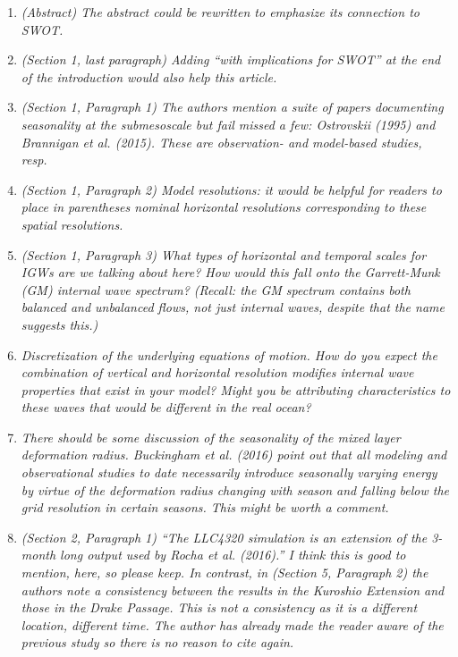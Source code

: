 \documentclass[11pt]{article}
\begin{document}
\begin{enumerate}
  \item {\it (Abstract) The abstract could be rewritten to emphasize its connection to SWOT.}

  \item {\it (Section 1, last paragraph) Adding “with implications for SWOT” at the end of the
          introduction would also help this article.}

  \item {\it (Section 1, Paragraph 1) The authors mention a suite of papers documenting
        seasonality at the submesoscale but fail missed a few: Ostrovskii (1995) and
        Brannigan et al. (2015). These are observation- and model-based studies, resp.}

  \item {\it (Section 1, Paragraph 2) Model resolutions: it would be helpful for readers to place in
        parentheses nominal horizontal resolutions corresponding to these spatial resolutions.}

  \item {\it (Section 1, Paragraph 3) What types of horizontal and temporal scales for IGWs are
        we talking about here? How would this fall onto the Garrett-Munk (GM) internal
        wave spectrum? (Recall: the GM spectrum contains both balanced and unbalanced
        flows, not just internal waves, despite that the name suggests this.)}

 \item {\it Discretization of the underlying equations of motion. How do you expect the
        combination of vertical and horizontal resolution modifies internal wave properties
        that exist in your model? Might you be attributing characteristics to these waves that
        would be different in the real ocean?}

\item {\it There should be some discussion of the seasonality of the mixed layer deformation
      radius. Buckingham et al. (2016) point out that all modeling and observational studies
      to date necessarily introduce seasonally varying energy by virtue of the deformation
      radius changing with season and falling below the grid resolution in certain seasons.
      This might be worth a comment.}

\item {\it (Section 2, Paragraph 1) ``The LLC4320 simulation is an extension of the 3-month
      long output used by Rocha et al. (2016).'' I think this is good to mention, here, so
      please keep. In contrast, in (Section 5, Paragraph 2) the authors note a consistency
      between the results in the Kuroshio Extension and those in the Drake Passage. This is
      not a consistency as it is a different location, different time. The author has already
      made the reader aware of the previous study so there is no reason to cite again.}


\end{enumerate}
\end{document}
